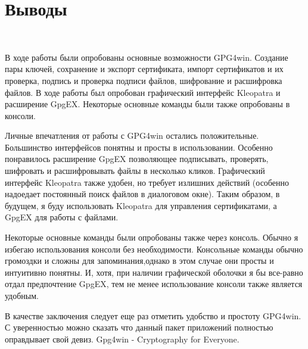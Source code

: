\documentclass{article}
\begin{document}
\section{Выводы}
~

В ходе работы были опробованы основные возможности GPG4win. Создание пары ключей, сохранение и экспорт сертификата, импорт сертификатов и их проверка, подпись и проверка подписи файлов, шифрование и расшифровка файлов. В ходе работы был опробован графический интерфейс Kleopatra и расширение GpgEX. Некоторые основные команды были также опробованы в консоли.

Личные впечатления от работы с GPG4win остались положительные. Большинство интерфейсов понятны и просты в использовании. Особенно понравилось расширение GpgEX позволяющее подписывать, проверять, шифровать и расшифровывать файлы в несколько кликов. Графический интерфейс Kleopatra также удобен, но требует излишних действий (особенно надоедает постоянный поиск файлов в диалоговом окне). Таким образом, в будущем, я буду использовать Kleopatra для управления сертификатами, а GpgEX для работы с файлами.

Некоторые основные команды были опробованы также через консоль. Обычно я избегаю использования консоли без необходимости. Консольные команды обычно громоздки и сложны для запоминания,однако в этом случае они просты и интуитивно понятны. И, хотя, при наличии графической оболочки я бы все-равно отдал предпочтение GpgEX, тем не менее использование консоли также является удобным.

В качестве заключения следует еще раз отметить удобство и простоту GPG4win. С уверенностью можно сказать что данный пакет приложений полностью оправдывает свой девиз. Gpg4win - Cryptography for Everyone.
\end{document}
